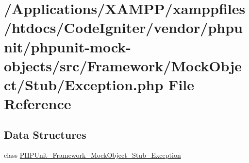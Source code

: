 \hypertarget{phpunit_2phpunit-mock-objects_2src_2_framework_2_mock_object_2_stub_2_exception_8php}{}\section{/\+Applications/\+X\+A\+M\+P\+P/xamppfiles/htdocs/\+Code\+Igniter/vendor/phpunit/phpunit-\/mock-\/objects/src/\+Framework/\+Mock\+Object/\+Stub/\+Exception.php File Reference}
\label{phpunit_2phpunit-mock-objects_2src_2_framework_2_mock_object_2_stub_2_exception_8php}
\subsection*{Data Structures}
\begin{DoxyCompactItemize}
\item 
class \mbox{\hyperlink{class_p_h_p_unit___framework___mock_object___stub___exception}{P\+H\+P\+Unit\+\_\+\+Framework\+\_\+\+Mock\+Object\+\_\+\+Stub\+\_\+\+Exception}}
\end{DoxyCompactItemize}
